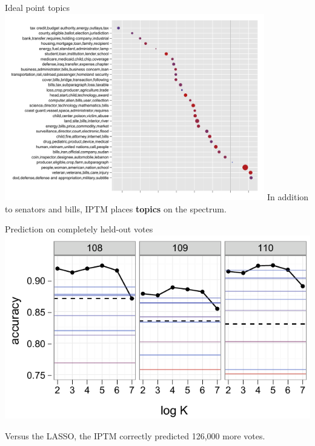 \message{ !name(sgerrish_prefpo.tex)}\documentclass{beamer}
\begin{document}
\begin{frame}{Ideal point topics}
  \includegraphics[width=0.85\textwidth]{figs/ideal-point-topics.pdf}
  In addition to senators and bills, IPTM places \textbf{topics} on the spectrum.
\end{frame}

\begin{frame}{Prediction on completely held-out votes}
  \includegraphics[width=0.75 \textwidth]{figs/vote-accuracy.pdf}
  \begin{center}
    Versus the LASSO, the IPTM correctly predicted 126,000 more
    votes.
  \end{center}
\end{frame}
\end{document}

